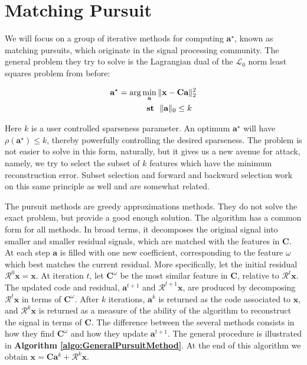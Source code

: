 \documentclass[12pt,a4paper,oneside,english]{UPBThesis}
\begin{document}
\section{Matching Pursuit}
\label{sec:MatchingPursuit}

We will focus on a group of iterative methods for computing $\textbf{a}^\star$, known as matching pursuits, which originate in the signal processing community. The general problem they try to solve is the Lagrangian dual of the $\mathcal{L}_0$ norm least squares problem from before:

\begin{align*}
\textbf{a}^\star = \arg & \min_\textbf{a} \|\textbf{x} - \textbf{C}\textbf{a}\|_2^2 \\
& \text{~~\textbf{st}~~} \|\textbf{a}\|_0 \leq k
\end{align*}

Here $k$ is a user controlled sparseness parameter. An optimum $\textbf{a}^\star$ will have $\rho(\textbf{a}^\star) \leq k$, thereby powerfully controlling the desired sparseness. The problem is not easier to solve in this form, naturally, but it gives us a new avenue for attack, namely, we try to select the subset of $k$ features which have the minimum reconstruction error. Subset selection and forward and backward selection work on this same principle as well and are somewhat related.

The pursuit methods are greedy approximations methods. They do not solve the exact problem, but provide a good enough solution. The algorithm has a common form for all methods. In broad terms, it decomposes the original signal into smaller and smaller residual signals, which are matched with the features in $\textbf{C}$. At each step $\textbf{a}$ is filled with one new coefficient, corresponding to the feature $\omega$ which best matches the current residual. More specifically, let the initial residual $\mathcal{R}^0\textbf{x} = \textbf{x}$. At iteration $t$, let $\textbf{C}^\omega$ be the most similar feature in $\textbf{C}$, relative to $\mathcal{R}^t\textbf{x}$. The updated code and residual, $\textbf{a}^{t+1}$ and $\mathcal{R}^{t+1}\textbf{x}$, are produced by decomposing $\mathcal{R}^t\textbf{x}$ in terms of $\textbf{C}^\omega$. After $k$ iterations, $\textbf{a}^k$ is returned as the code associated to $\textbf{x}$, and $\mathcal{R}^k\textbf{x}$ is returned as a measure of the ability of the algorithm to reconstruct the signal in terms of $\textbf{C}$. The difference between the several methods consists in how they find $\textbf{C}^\omega$ and how they update $\textbf{a}^{t+1}$. The general procedure is illustrated in \textbf{Algorithm \ref{algo:GeneralPursuitMethod}}. At the end of this algorithm we obtain $\textbf{x} = \textbf{C}\textbf{a}^k + \mathcal{R}^k\textbf{x}$.
\end{document}

